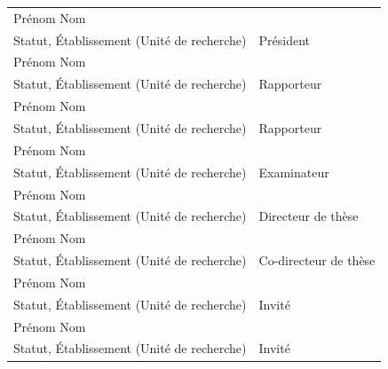 \documentclass[a4paper]{article}
\newcommand{\jurynameA}{Prénom Nom}
\newcommand{\juryadressA}{Statut, Établissement (Unité de recherche)}
\newcommand{\juryroleA}{Président}
\newcommand{\jurynameB}{Prénom Nom}
\newcommand{\juryadressB}{Statut, Établissement (Unité de recherche)}
\newcommand{\juryroleB}{Rapporteur}
\newcommand{\jurynameC}{Prénom Nom}
\newcommand{\juryadressC}{Statut, Établissement (Unité de recherche)}
\newcommand{\juryroleC}{Rapporteur}
\newcommand{\jurynameD}{Prénom Nom}
\newcommand{\juryadressD}{Statut, Établissement (Unité de recherche)}
\newcommand{\juryroleD}{Examinateur}
\newcommand{\jurynameE}{Prénom Nom}
\newcommand{\juryadressE}{Statut, Établissement (Unité de recherche)}
\newcommand{\juryroleE}{Directeur de thèse}
\newcommand{\jurynameF}{Prénom Nom}
\newcommand{\juryadressF}{Statut, Établissement (Unité de recherche)}
\newcommand{\juryroleF}{Co-directeur de thèse}
\newcommand{\jurynameG}{Prénom Nom}
\newcommand{\juryadressG}{Statut, Établissement (Unité de recherche)}
\newcommand{\juryroleG}{Invité}
\newcommand{\jurynameH}{Prénom Nom}
\newcommand{\juryadressH}{Statut, Établissement (Unité de recherche)}
\newcommand{\juryroleH}{Invité}
\begin{document}
\begin{textblock}{10}
	\label{jury} 																				%
	\begin{flushleft}
	\begin{tabular}{@{} L{9.64cm} R{4.5cm}}
		\jurynameA  \\ \juryadressA & \juryroleA \\[5pt]
		\jurynameB  \\ \juryadressB & \juryroleB \\[5pt]
		\jurynameC  \\ \juryadressC & \juryroleC \\[5pt]
		\jurynameD  \\ \juryadressD & \juryroleD \\[5pt]
		\jurynameE  \\ \juryadressE & \juryroleE \\[5pt]
		\jurynameF  \\ \juryadressF & \juryroleF \\[5pt]
		\jurynameG  \\ \juryadressG & \juryroleG \\[5pt]
		\jurynameH  \\ \juryadressH & \juryroleH \\[5pt]
	\end{tabular} 
	\end{flushleft}   
\end{textblock}
\end{document}

